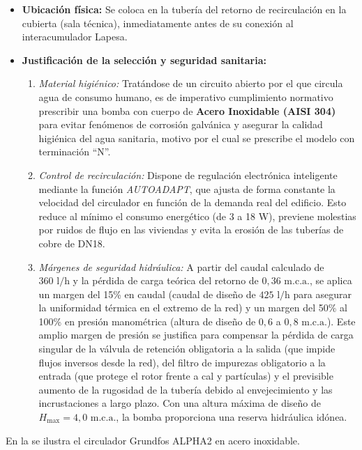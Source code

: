 \documentclass[12pt]{article}
\begin{document}
\begin{itemize}
    \item \textbf{Ubicación física:} Se coloca en la tubería del retorno de recirculación en la cubierta (sala técnica), inmediatamente antes de su conexión al interacumulador Lapesa.
    \item \textbf{Justificación de la selección y seguridad sanitaria:}
    \begin{enumerate}
        \item \textit{Material higiénico:} Tratándose de un circuito abierto por el que circula agua de consumo humano, es de imperativo cumplimiento normativo prescribir una bomba con cuerpo de \textbf{Acero Inoxidable (AISI 304)} para evitar fenómenos de corrosión galvánica y asegurar la calidad higiénica del agua sanitaria, motivo por el cual se prescribe el modelo con terminación ``N''.
        \item \textit{Control de recirculación:} Dispone de regulación electrónica inteligente mediante la función \textit{AUTOADAPT}, que ajusta de forma constante la velocidad del circulador en función de la demanda real del edificio. Esto reduce al mínimo el consumo energético (de 3 a 18 W), previene molestias por ruidos de flujo en las viviendas y evita la erosión de las tuberías de cobre de DN18.
        \item \textit{Márgenes de seguridad hidráulica:} A partir del caudal calculado de $360\text{ l/h}$ y la pérdida de carga teórica del retorno de $0,36\text{ m.c.a.}$, se aplica un margen del 15\% en caudal (caudal de diseño de $425\text{ l/h}$ para asegurar la uniformidad térmica en el extremo de la red) y un margen del 50\% al 100\% en presión manométrica (altura de diseño de $0,6$ a $0,8\text{ m.c.a.}$). Este amplio margen de presión se justifica para compensar la pérdida de carga singular de la válvula de retención obligatoria a la salida (que impide flujos inversos desde la red), del filtro de impurezas obligatorio a la entrada (que protege el rotor frente a cal y partículas) y el previsible aumento de la rugosidad de la tubería debido al envejecimiento y las incrustaciones a largo plazo. Con una altura máxima de diseño de $H_{\text{max}} = 4,0\text{ m.c.a.}$, la bomba proporciona una reserva hidráulica idónea.
    \end{enumerate}
\end{itemize}

En la  se ilustra el circulador Grundfos ALPHA2 en acero inoxidable.
\end{document}
